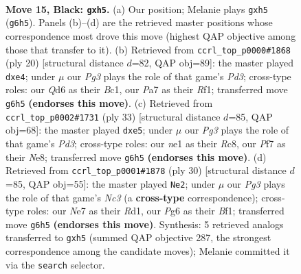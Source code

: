 \documentclass[11pt]{article}
\begin{document}
\clearpage

\begin{figure}[p]\centering
\begin{subfigure}{0.46\textwidth}\centering
\resizebox{\linewidth}{!}{%
\newchessgame
\chessboard[
  setfen={nrb2rk1/pp2npbp/3q2p1/2p1p2P/6P1/3PP3/PP3PBK/RNBQNR2 b - - 0 15},
  showmover=false,
  pgfstyle=straightmove, color=movearrow, markmove={g6-h5}
]}
\caption{}
\end{subfigure}\hfill
\begin{subfigure}{0.46\textwidth}\centering
\resizebox{\linewidth}{!}{%
\newchessgame
\chessboard[
  setfen={rn1qkb1r/pbp4p/1p5n/5p2/2N1p2p/3P2P1/PPQ1PPBP/R1B2RK1 w kq - 0 11},
  showmover=false,
  pgfstyle=straightmove, color=movearrow, markmove={d3-e4}
]}
\caption{}
\end{subfigure}
\\[4pt]
\begin{subfigure}{0.46\textwidth}\centering
\resizebox{\linewidth}{!}{%
\newchessgame
\chessboard[
  setfen={2r1nrk1/1bq1bppp/p2pp3/1p2P3/3B1P2/P1N1Q3/1PP1B1PP/4RR1K b - - 0 17},
  showmover=false,
  pgfstyle=straightmove, color=movearrow, markmove={d6-e5}
]}
\caption{}
\end{subfigure}\hfill
\begin{subfigure}{0.46\textwidth}\centering
\resizebox{\linewidth}{!}{%
\newchessgame
\chessboard[
  setfen={1rb1k2r/2qnbpp1/p2pp2p/1p6/4P1P1/2N2P2/PPPQ1B1P/1K1R1BR1 w k - 5 16},
  showmover=false,
  pgfstyle=straightmove, color=movearrow, markmove={c3-e2}
]}
\caption{}
\end{subfigure}
\caption{\textbf{Move 15, Black: \texttt{gxh5}.} (a) Our position; Melanie plays \texttt{gxh5} (\texttt{g6h5}). Panels (b)--(d) are the retrieved master positions whose correspondence most drove this move (highest QAP objective among those that transfer to it). (b) Retrieved from \texttt{ccrl\_top\_p0000\#1868} (ply 20) [structural distance $d$=82, QAP obj=89]: the master played \texttt{dxe4}; under $\mu$ our \emph{Pg3} plays the role of that game's \emph{Pd3}; cross-type roles: our \emph{Q}d6 as their \emph{B}c1, our \emph{P}a7 as their \emph{R}f1; transferred move \texttt{g6h5} \textbf{(endorses this move)}. (c) Retrieved from \texttt{ccrl\_top\_p0002\#1731} (ply 33) [structural distance $d$=85, QAP obj=68]: the master played \texttt{dxe5}; under $\mu$ our \emph{Pg3} plays the role of that game's \emph{Pd3}; cross-type roles: our \emph{n}e1 as their \emph{R}c8, our \emph{P}f7 as their \emph{N}e8; transferred move \texttt{g6h5} \textbf{(endorses this move)}. (d) Retrieved from \texttt{ccrl\_top\_p0001\#1878} (ply 30) [structural distance $d$=85, QAP obj=55]: the master played \texttt{Ne2}; under $\mu$ our \emph{Pg3} plays the role of that game's \emph{Nc3} (a \textbf{cross-type} correspondence); cross-type roles: our \emph{N}e7 as their \emph{R}d1, our \emph{P}g6 as their \emph{B}f1; transferred move \texttt{g6h5} \textbf{(endorses this move)}. Synthesis: 5 retrieved analogs transferred to \texttt{gxh5} (summed QAP objective 287, the strongest correspondence among the candidate moves); Melanie committed it via the \texttt{search} selector.}
\label{fig:thought-m29}
\end{figure}
\end{document}
